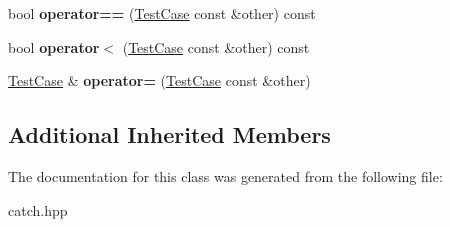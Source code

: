\begin{DoxyCompactItemize}
\mbox{\label{class_catch_1_1_test_case_a5456d03a90f75292835c158f3a3374a1}} 
bool {\bfseries operator==} (\hyperlink{class_catch_1_1_test_case}{Test\+Case} const \&other) const
\item 
\mbox{\label{class_catch_1_1_test_case_a030e4b9282e9b32e08c8bd5e5cd6fa98}} 
bool {\bfseries operator$<$} (\hyperlink{class_catch_1_1_test_case}{Test\+Case} const \&other) const
\item 
\mbox{\label{class_catch_1_1_test_case_a8022e3f74232f7887d2d2cbbc8876502}} 
\hyperlink{class_catch_1_1_test_case}{Test\+Case} \& {\bfseries operator=} (\hyperlink{class_catch_1_1_test_case}{Test\+Case} const \&other)
\end{DoxyCompactItemize}
\subsection*{Additional Inherited Members}


The documentation for this class was generated from the following file\+:\begin{DoxyCompactItemize}
\item 
catch.\+hpp\end{DoxyCompactItemize}
